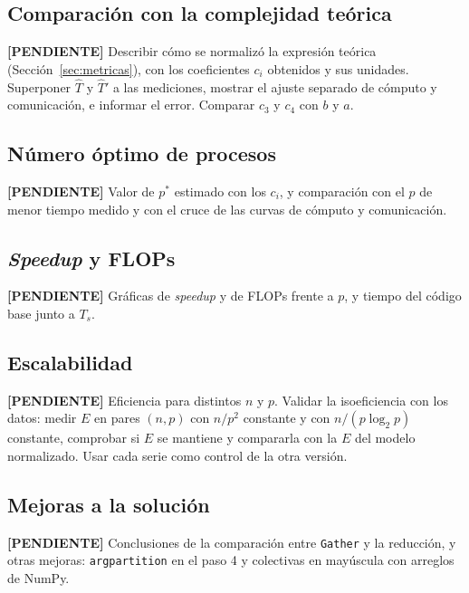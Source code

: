 \documentclass[11pt,a4paper]{article}
\newcommand{\pendiente}[1]{\textcolor{red!75!black}{\textbf{[PENDIENTE]} #1}}
\begin{document}
\subsection{Comparación con la complejidad teórica}
\pendiente{Describir cómo se normalizó la expresión teórica (Sección~\ref{sec:metricas}), con los coeficientes $c_i$ obtenidos y sus unidades. Superponer $\hat T$ y $\hat T'$ a las mediciones, mostrar el ajuste separado de cómputo y comunicación, e informar el error. Comparar $c_3$ y $c_4$ con $b$ y $a$.}

\subsection{Número óptimo de procesos}
\pendiente{Valor de $p^*$ estimado con los $c_i$, y comparación con el $p$ de menor tiempo medido y con el cruce de las curvas de cómputo y comunicación.}

\subsection{\textit{Speedup} y FLOPs}
\pendiente{Gráficas de \textit{speedup} y de FLOPs frente a $p$, y tiempo del código base junto a $T_s$.}

\subsection{Escalabilidad}
\label{sec:escalabilidad}
\pendiente{Eficiencia para distintos $n$ y $p$. Validar la isoeficiencia con los datos: medir $E$ en pares $(n,p)$ con $n/p^2$ constante y con $n/(p\log_2 p)$ constante, comprobar si $E$ se mantiene y compararla con la $E$ del modelo normalizado. Usar cada serie como control de la otra versión.}

\subsection{Mejoras a la solución}
\pendiente{Conclusiones de la comparación entre \texttt{Gather} y la reducción, y otras mejoras: \texttt{argpartition} en el paso 4 y colectivas en mayúscula con arreglos de NumPy.}
\end{document}
